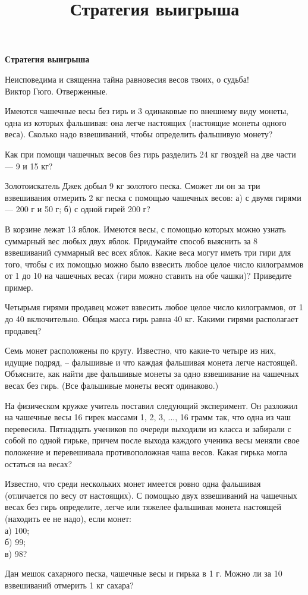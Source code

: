 \centerline{\bf \Huge Стратегия выигрыша}
\title{Стратегия выигрыша}

\begin{flushright}
    \scriptsize Неисповедима и священна тайна равновесия весов твоих, о судьба!\\Виктор Гюго. Отверженные.
\end{flushright}

 Имеются чашечные весы без гирь и 3 одинаковые по внешнему виду монеты, одна из которых фальшивая: она легче настоящих (настоящие монеты одного веса). Сколько надо взвешиваний, чтобы определить фальшивую монету? 

 Как при помощи чашечных весов без гирь разделить 24 кг гвоздей на две части — 9 и 15 кг?

 Золотоискатель Джек добыл 9 кг золотого песка. Сможет ли он за три взвешивания отмерить 2 кг песка с помощью чашечных весов: а) с двумя гирями — 200 г и 50 г; б) с одной гирей 200 г?

 В корзине лежат 13 яблок. Имеются весы, с помощью которых можно узнать суммарный вес любых двух яблок.
Придумайте способ выяснить за 8 взвешиваний суммарный вес всех яблок.
 Какие веса могут иметь три гири для того, чтобы с их помощью можно было взвесить любое целое число килограммов от 1 до 10 на чашечных весах (гири можно ставить на обе чашки)? Приведите пример.

 Четырьмя гирями продавец может взвесить любое целое число килограммов, от 1 до 40 включительно. Общая масса гирь равна 40 кг. Какими гирями располагает продавец?

 Семь монет расположены по кругу. Известно, что какие-то четыре из них, идущие подряд, – фальшивые и что каждая фальшивая монета легче настоящей. Объясните, как найти две фальшивые монеты за одно взвешивание на чашечных весах без гирь. (Все фальшивые монеты весят одинаково.)

 На физическом кружке учитель поставил следующий эксперимент. Он разложил на чашечные весы 16 гирек массами 1, 2, 3, ..., 16 грамм так, что одна из чаш перевесила. Пятнадцать учеников по очереди выходили из класса и забирали с собой по одной гирьке, причем после выхода каждого ученика весы меняли свое положение и перевешивала противоположная чаша весов. Какая гирька могла остаться на весах?

\newpage

 Известно, что среди нескольких монет имеется ровно одна фальшивая (отличается по весу от настоящих). С помощью двух взвешиваний на чашечных весах без гирь определите, легче или тяжелее фальшивая монета настоящей (находить ее не надо), если монет:\\
а) 100;\\
б) 99;\\
в) 98?
  
 Дан мешок сахарного песка, чашечные весы и гирька в 1 г. Можно ли за 10 взвешиваний отмерить 1 кг сахара?